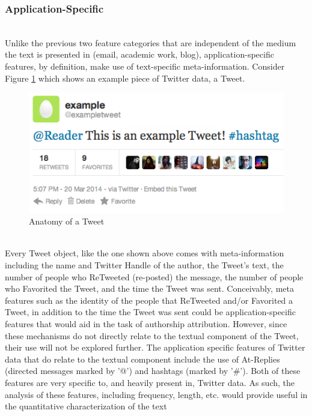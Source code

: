 \documentclass[pageno]{jpaper}
\begin{document}
\subsubsection{Application-Specific}
\label{sec:applicationSpecific}
\indent \\
Unlike the previous two feature categories that are independent of the medium the text is presented in (email, academic work, blog), application-specific features, by definition, make use of text-specific meta-information.  Consider Figure \ref{fig:Tweet} which shows an example piece of Twitter data, a Tweet.
\begin{figure}[h!]
\begin{center}
\includegraphics*[scale = .55]{example_Tweet}
\end{center}
\caption{Anatomy of a Tweet}
\label{fig:Tweet}
\end{figure}
\\
Every Tweet object, like the one shown above comes with meta-information including the name and Twitter Handle of the author, the Tweet's text, the number of people who ReTweeted (re-posted) the message, the number of people who Favorited the Tweet, and the time the Tweet was sent.  Conceivably, meta features such as the identity of the people that ReTweeted and/or Favorited a Tweet, in addition to the time the Tweet was sent could be application-specific features that would aid in the task of authorship attribution.  However, since these mechanisms do not directly relate to the textual component of the Tweet, their use will not be explored further.  The application specific features of Twitter data that do relate to the textual component include the use of At-Replies (directed messages marked by '@') and hashtags (marked by '\#').  Both of these features are very specific to, and heavily present in, Twitter data.  As such, the analysis of these features, including frequency, length, etc. would provide useful in the quantitative characterization of the text
\end{document}
